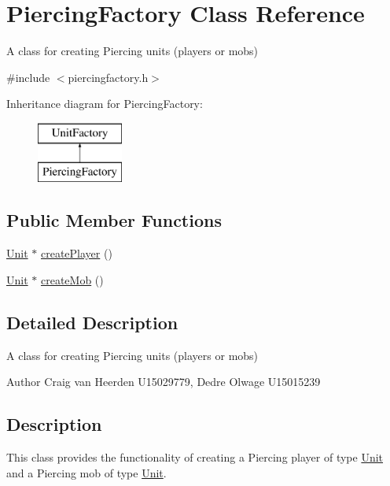 \hypertarget{class_piercing_factory}{\section{\-Piercing\-Factory \-Class \-Reference}
\label{class_piercing_factory}
}


\-A class for creating \-Piercing units (players or mobs)  




{\ttfamily \#include $<$piercingfactory.\-h$>$}

\-Inheritance diagram for \-Piercing\-Factory\-:\begin{figure}[H]
\begin{center}
\leavevmode
\includegraphics[height=2.000000cm]{class_piercing_factory}
\end{center}
\end{figure}
\subsection*{\-Public \-Member \-Functions}
\begin{DoxyCompactItemize}
\item 
\hyperlink{class_unit}{\-Unit} $\ast$ \hyperlink{class_piercing_factory_a3a2f3736e85a5c4b0ad0160b1b34d796}{create\-Player} ()
\item 
\hyperlink{class_unit}{\-Unit} $\ast$ \hyperlink{class_piercing_factory_aec71380dc9ecb1cb4034fb8a898d1d45}{create\-Mob} ()
\end{DoxyCompactItemize}


\subsection{\-Detailed \-Description}
\-A class for creating \-Piercing units (players or mobs) 

\begin{DoxyAuthor}{\-Author}
\-Craig van \-Heerden \-U15029779, \-Dedre \-Olwage \-U15015239
\end{DoxyAuthor}
\hypertarget{class_unit_factory_Description}{}\subsection{\-Description}\label{class_unit_factory_Description}
\-This class provides the functionality of creating a \-Piercing player of type \hyperlink{class_unit}{\-Unit} and a \-Piercing mob of type \hyperlink{class_unit}{\-Unit}. 

